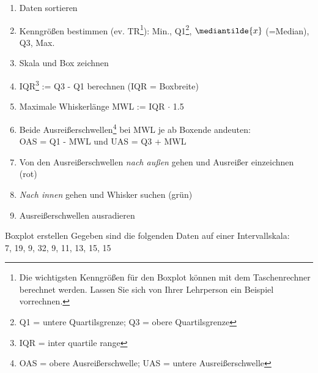 \begin{rezept}{}{}
  \begin{enumerate}
    \item Daten sortieren
  \item Kenngrößen bestimmen (ev. TR\footnote{Die wichtigsten Kenngrößen für den Boxplot können mit dem Taschenrechner berechnet werden. Lassen Sie sich von Ihrer Lehrperson ein Beispiel vorrechnen.}): Min., Q1\footnote{Q1 = untere
    Quartilsgrenze; Q3 = obere Quartilsgrenze}, $\mediantilde{x}$ (=Median),  Q3, Max.
  \item Skala und Box zeichnen
  \item IQR\footnote{IQR = inter quartile range} := Q3 - Q1
    berechnen (IQR = Boxbreite)
    \item Maximale Whiskerlänge MWL := IQR $\cdot{}$ 1.5
  \item Beide Ausreißerschwellen\footnote{OAS = obere Ausreißerschwelle; UAS = untere Ausreißerschwelle} bei MWL je ab Boxende andeuten:\\
    OAS =
    Q1 - MWL und UAS = Q3 + MWL
  \item Von den Ausreißerschwellen \textit{nach außen} gehen und
    Ausreißer einzeichnen (rot)
  \item \textit{Nach innen} gehen und Whisker suchen (grün)
  \item Ausreißerschwellen ausradieren
  \end{enumerate}
\end{rezept}
\newpage

\begin{beispiel}{Boxplot erstellen}{}
  Gegeben sind die folgenden Daten auf einer Intervallskala:\\
  7, 19, 9, 32, 9, 11, 13, 15, 15
\end{beispiel}

